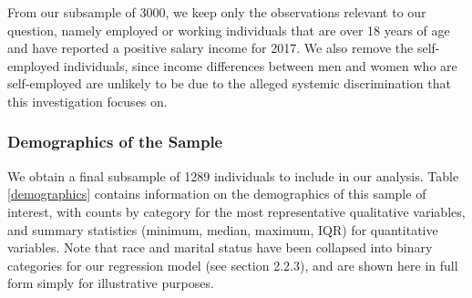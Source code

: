 \documentclass{article}
\begin{document}
From our subsample of 3000, we keep only the observations relevant to our question, namely employed or working individuals that are over 18 years of age and have reported a positive salary income for 2017. We also remove the self-employed individuals, since income differences between men and women who are self-employed are unlikely to be due to the alleged systemic discrimination that this investigation focuses on.

\subsubsection{Demographics of the Sample}

We obtain a final subsample of 1289 individuals to include in our analysis. Table \ref{demographics} contains information on the demographics of this sample of interest, with counts by category for the most representative qualitative variables, and summary statistics (minimum, median, maximum, IQR) for quantitative variables. Note that race and marital status have been collapsed into binary categories for our regression model (see section 2.2.3), and are shown here in full form simply for illustrative purposes.
\end{document}

